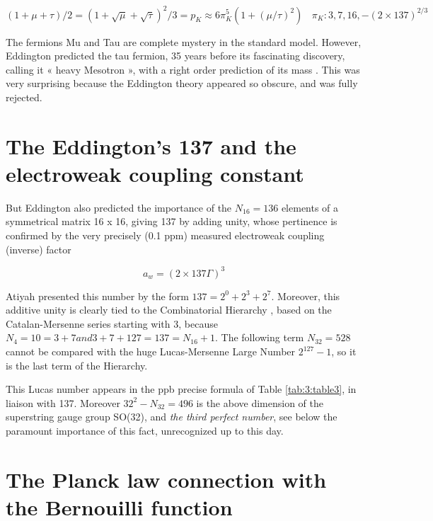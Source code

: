 \documentclass[a4paper,9pt]{article}
\begin{document}
\begin{equation}
(1 + \mu + \tau)/2 = (1 + \sqrt{\mu} + \sqrt{\tau})^2/3 = p_K \approx 6\pi_K^5 (1+(\mu / \tau)^2) ~~~~\pi_K: 3,7,16,-(2\times 137)^{2/3}
\end{equation}

The fermions Mu and Tau are complete mystery in the standard model. However, Eddington predicted the tau fermion, 35 years before its fascinating discovery, calling it « heavy Mesotron », with a right order prediction of its mass \cite{Eddington}.  This was very surprising because the Eddington theory appeared so obscure, and was fully rejected.

     




\section{The Eddington's 137 and the electroweak coupling constant}

But Eddington also predicted the importance of the $N_{16} = 136$ elements of a symmetrical matrix 16 x 16, giving 137 by adding unity, whose pertinence is confirmed by the very precisely (0.1 ppm) measured electroweak coupling (inverse) factor 

\begin{equation}
a_w = (2\times137 \Gamma)^3
\end{equation}
 
Atiyah presented this number by the form $137 = 2^0 + 2^3 + 2^7$. Moreover, this additive unity is clearly tied to the Combinatorial Hierarchy \cite{Bastin}, based on the Catalan-Mersenne series starting with 3, because $N_4 = 10 = 3 + 7 and 3+7 + 127 = 137 = N_{16} + 1$. The following term $N_{32}  = 528$ cannot be compared with the huge Lucas-Mersenne Large Number $2^{127}- 1$, so it is the last term of the Hierarchy. 

This Lucas number appears in the ppb precise formula of Table \ref{tab:3:table3}, in liaison with 137. Moreover $32^2 - N_{32} =  496$ is the above dimension of the superstring gauge group SO(32), and \textit {the third perfect number}, see below the paramount importance of this fact, unrecognized up to this day.









\section{The Planck law connection with the Bernouilli function}
\end{document}
